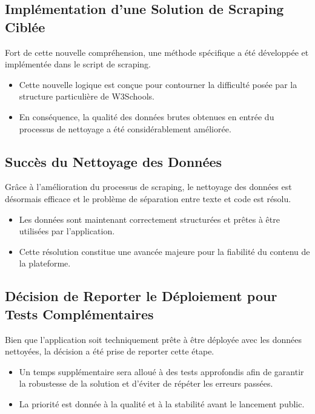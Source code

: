 \documentclass[12pt, a4paper]{article}
\begin{document}
\subsection{Implémentation d'une Solution de Scraping Ciblée}
Fort de cette nouvelle compréhension, une méthode spécifique a été développée et implémentée dans le script de scraping.
\begin{itemize}
    \item Cette nouvelle logique est conçue pour contourner la difficulté posée par la structure particulière de W3Schools.
    \item En conséquence, la qualité des données brutes obtenues en entrée du processus de nettoyage a été considérablement améliorée.
\end{itemize}

\subsection{Succès du Nettoyage des Données}
Grâce à l'amélioration du processus de scraping, le nettoyage des données est désormais efficace et le problème de séparation entre texte et code est résolu.
\begin{itemize}
    \item Les données sont maintenant correctement structurées et prêtes à être utilisées par l'application.
    \item Cette résolution constitue une avancée majeure pour la fiabilité du contenu de la plateforme.
\end{itemize}

\subsection{Décision de Reporter le Déploiement pour Tests Complémentaires}
Bien que l'application soit techniquement prête à être déployée avec les données nettoyées, la décision a été prise de reporter cette étape.
\begin{itemize}
    \item Un temps supplémentaire sera alloué à des tests approfondis afin de garantir la robustesse de la solution et d'éviter de répéter les erreurs passées.
    \item La priorité est donnée à la qualité et à la stabilité avant le lancement public.
\end{itemize}
\end{document}
